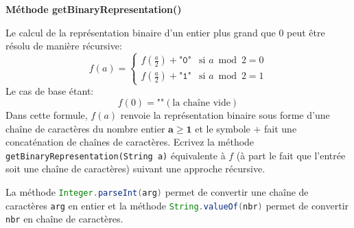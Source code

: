 \begin{Exercice}[10 minutes] [Java] \textbf{Méthode getBinaryRepresentation()} 
	
 Le calcul de la représentation binaire d'un entier plus grand que 0 peut être résolu de manière récursive: 
 \begin{equation}
    f(a) = \begin{cases}
        f\left(\frac{a}{2}\right) + \texttt{"0"} & \text{si } a \bmod 2 = 0 \\
        f\left(\frac{a}{2}\right) + \texttt{"1"} & \text{si } a \bmod 2 = 1
    \end{cases}
\end{equation}
Le cas de base étant:
\begin{equation}
f(0) = \texttt{""} (\text{la chaîne vide})
\end{equation}
Dans cette formule, $f(a)$ renvoie la représentation binaire sous forme d'une chaîne de caractères du nombre entier $\mathbf{a\geq 1}$ et le symbole $+$ fait une concaténation de chaînes de caractères.\newline  \newline 
        Ecrivez la méthode \lstinline{getBinaryRepresentation(String a)} équivalente à $f$ (à part le fait que l'entrée soit une chaîne de caractères) suivant une approche récursive. \\ 
        
            \begin{conseil} 
            La méthode \lstinline[language=Java]|Integer.parseInt(arg)| permet de convertir une chaîne de caractères \texttt{arg} en entier et la méthode \lstinline[language=Java]|String.valueOf(nbr)| permet de convertir \texttt{nbr} en chaîne de caractères.  
            \end{conseil} 
        
            \begin{solution} 
                
            \end{solution} 
\end{Exercice}
    
        

